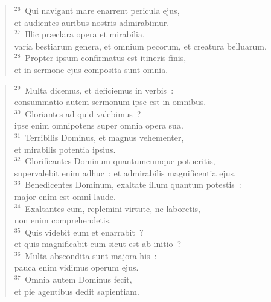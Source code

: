 \begin{flushleft}
\begin{verse}
${}^{26}$~Qui navigant mare enarrent pericula ejus,\\ et audientes auribus nostris admirabimur.\\
${}^{27}$~Illic pr\ae clara opera et mirabilia,\\ varia bestiarum genera, et omnium pecorum, et creatura belluarum.\\
${}^{28}$~Propter ipsum confirmatus est itineris finis,\\ et in sermone ejus composita sunt omnia.\end{verse}\end{flushleft}


\begin{flushleft}\begin{verse}${}^{29}$~Multa dicemus, et deficiemus in verbis~:\\ consummatio autem sermonum ipse est in omnibus.\\
${}^{30}$~Gloriantes ad quid valebimus~?\\ ipse enim omnipotens super omnia opera sua.\\
${}^{31}$~Terribilis Dominus, et magnus vehementer,\\ et mirabilis potentia ipsius.\\
${}^{32}$~Glorificantes Dominum quantumcumque potueritis,\\ supervalebit enim adhuc~: et admirabilis magnificentia ejus.\\
${}^{33}$~Benedicentes Dominum, exaltate illum quantum potestis~:\\ major enim est omni laude.\\
${}^{34}$~Exaltantes eum, replemini virtute, ne laboretis,\\ non enim comprehendetis.\\
${}^{35}$~Quis videbit eum et enarrabit~?\\ et quis magnificabit eum sicut est ab initio~?\\
${}^{36}$~Multa abscondita sunt majora his~:\\ pauca enim vidimus operum ejus.\\
${}^{37}$~Omnia autem Dominus fecit,\\ et pie agentibus dedit sapientiam.\end{verse}\end{flushleft}


